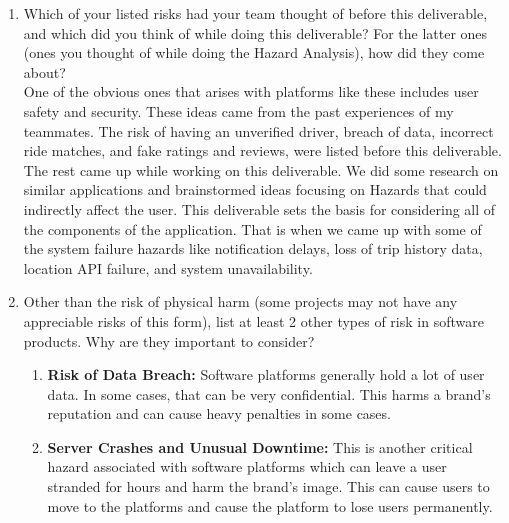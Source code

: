 \documentclass{article}
\begin{document}
\begin{enumerate}
Aidan: \\
The main challenge I faced was distinguishing between what belonged in the SRS versus the Hazard Analysis. Since both documents discuss risks and requirements, it took some coordination to avoid overlap or repetition. Another pain point was keeping the FMEA table concise while still providing enough detail to make each hazard meaningful — at first, it was easy to get lost in too much explanation. I resolved these issues by reviewing past examples and our TA’s guidance to clarify expectations, and by working closely with teammates to check for consistency across both documents. Once we streamlined our structure, the writing process became much more efficient.
\\

    \item Which of your listed risks had your team thought of before this
    deliverable, and which did you think of while doing this deliverable? For
    the latter ones (ones you thought of while doing the Hazard Analysis), how
    did they come about?\\

   One of the obvious ones that arises with platforms like these includes user safety and security. These ideas came from the past experiences of my teammates. The risk of having an unverified driver, breach of data, incorrect ride matches, and fake ratings and reviews, were listed before this deliverable. The rest came up while working on this deliverable. We did some research on similar applications and brainstormed ideas focusing on Hazards that could indirectly affect the user. This deliverable sets the basis for considering all of the components of the application. That is when we came up with some of the system failure hazards like notification delays, loss of trip history data, location API failure, and system unavailability. 

    \item Other than the risk of physical harm (some projects may not have any
    appreciable risks of this form), list at least 2 other types of risk in
    software products. Why are they important to consider?\\
    \begin{enumerate}
    \item \textbf{Risk of Data Breach:} Software platforms generally hold a lot of user data. In some cases, that can be very confidential. This harms a brand's reputation and can cause heavy penalties in some cases.  
    \item \textbf{Server Crashes and Unusual Downtime:} This is another critical hazard associated with software platforms which can leave a user stranded for hours and harm the brand's image. This can cause users to move to the platforms and cause the platform to lose users permanently.  
\end{enumerate}



\end{enumerate}
\end{document}
